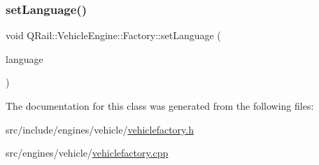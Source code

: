 \mbox{\label{classQRail_1_1VehicleEngine_1_1Factory_ac3eb925f008fbe65aa63ac4e1891cbb2}} 
\subsubsection{\texorpdfstring{setLanguage()}{setLanguage()}}
{\footnotesize\ttfamily void Q\+Rail\+::\+Vehicle\+Engine\+::\+Factory\+::set\+Language (\begin{DoxyParamCaption}\item[{const Q\+Locale\+::\+Language \&}]{language }\end{DoxyParamCaption})}



The documentation for this class was generated from the following files\+:\begin{DoxyCompactItemize}
\item 
src/include/engines/vehicle/\mbox{\hyperlink{vehiclefactory_8h}{vehiclefactory.\+h}}\item 
src/engines/vehicle/\mbox{\hyperlink{vehiclefactory_8cpp}{vehiclefactory.\+cpp}}\end{DoxyCompactItemize}
